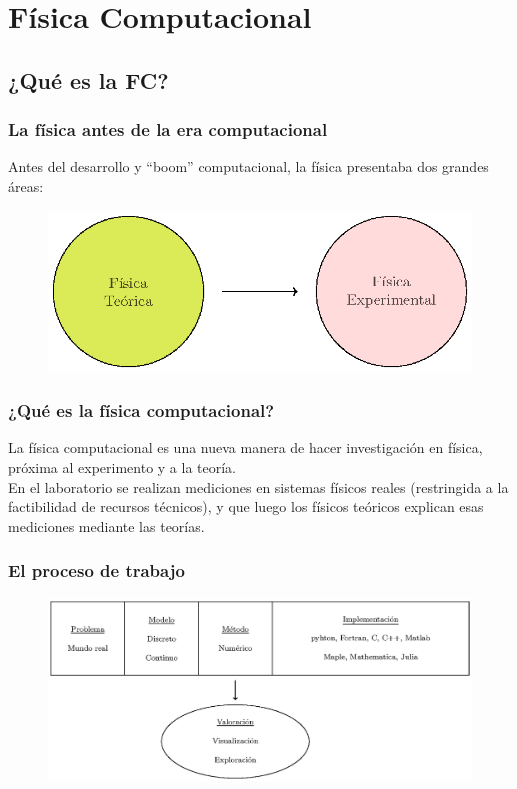 \documentclass[12pt]{beamer}
\begin{document}
\section{Física Computacional}
\subsection{¿Qué es la FC?}

\begin{frame}
\frametitle{La física antes de la era computacional}
Antes del desarrollo y \enquote{boom} computacional, la física presentaba dos grandes áreas:
\pause
\begin{figure}
	\centering
	\includegraphics[scale=1]{Imagenes/figura_02.eps}
	\end{figure}
\end{frame}
\begin{frame}
\frametitle{¿Qué es la física computacional?}
La física computacional es una nueva manera de hacer investigación en física, próxima al
experimento y a la teoría.
\\
\bigskip
\pause
En el laboratorio se realizan mediciones en sistemas físicos reales (restringida a la factibilidad de recursos técnicos), y que luego los físicos teóricos explican esas mediciones mediante las teorías.
\end{frame}
\begin{frame}[fragile]
\frametitle{El proceso de trabajo}
\begin{figure}
	\centering
	\hspace*{-1cm}
	\includegraphics[scale=0.7]{Imagenes/figura_03.eps}
\end{figure}
\end{frame}
\end{document}
